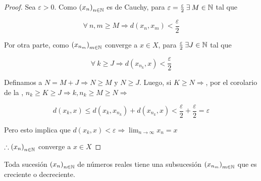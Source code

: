 \begin{proof}
    Sea $\varepsilon > 0$. Como ${\left( x_n\right)}_{n \in \mathbb{N}}$ es de Cauchy, para $\varepsilon = \frac{\varepsilon}{2} \: \exists \: M \in \mathbb{N}$ tal que 

    $$\forall \: n,m \geqslant M \Rightarrow d(x_n, x_m) < \frac{\varepsilon}{2}$$

    Por otra parte, como ${\left( x_{n_m}\right)}_{m \in \mathbb{N}}$ converge a $x \in X$, para $\frac{\varepsilon}{2} \: \exists J \in \mathbb{N}$ tal que

    $$\forall \: k \geqslant J \Rightarrow d(x_{n_k}, x) < \frac{\varepsilon}{2}$$

    Definamos a $N = M + J \Rightarrow N \geqslant M$ y $N \geqslant J$. Luego, si $K \geqslant N \Rightarrow$, por el corolario de la , $n_k \geqslant K \geqslant J \Rightarrow k, n_k \geqslant M \geqslant N \Rightarrow$

    $$d(x_k, x) \leqslant d(x_k, x_{n_k}) + d(x_{n_k}, x) < \frac{\varepsilon}{2} + \frac{\varepsilon}{2} = \varepsilon$$

    Pero esto implica que $d(x_k, x) < \varepsilon \Rightarrow \lim_{n \to \infty} x_n = x$

    $\therefore {\left( x_n\right)}_{n \in \mathbb{N}}$ converge a $x \in X$
\end{proof}

\begin{lemma} \label{lemma411}
    Toda sucesión ${\left( x_n\right)}_{n \in \mathbb{N}}$ de números reales tiene una subsucesión ${\left( x_{n_m}\right)}_{m \in \mathbb{N}}$ que es creciente o decreciente.
\end{lemma}

